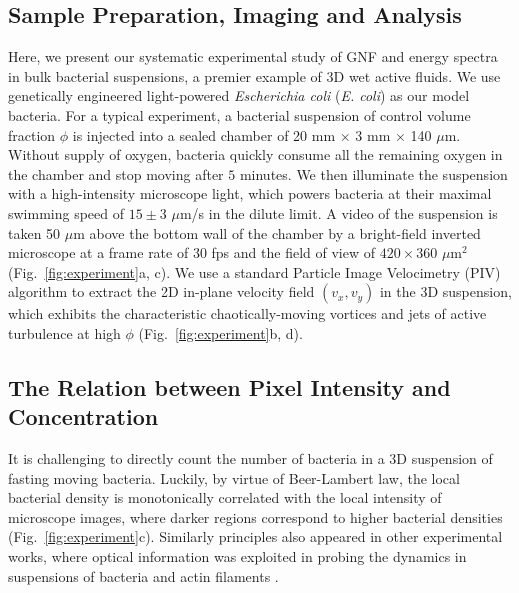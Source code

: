\subsection{Sample Preparation, Imaging and Analysis}
Here, we present our systematic experimental study of GNF and energy spectra in bulk bacterial suspensions, a premier example of 3D wet active fluids. We use genetically engineered light-powered \textit{Escherichia coli} (\textit{E. coli}) as our model bacteria.
For a typical experiment, a bacterial suspension of control volume fraction $\phi$ is injected into a sealed chamber of 20 mm $\times$ 3 mm $\times$ 140 $\mu$m.
Without supply of oxygen, bacteria quickly consume all the remaining oxygen in the chamber and stop moving after $5$ minutes.
We then illuminate the suspension with a high-intensity microscope light, which powers bacteria at their maximal swimming speed of $15 \pm 3$ $\mu$m/s in the dilute limit.
A video of the suspension is taken 50 $\mu$m above the bottom wall of the chamber by a bright-field inverted microscope at a frame rate of $30$ fps and the field of view of $420 \times 360$ $\mu$m$^2$ (Fig.~\ref{fig:experiment}a, c).
We use a standard Particle Image Velocimetry (PIV) algorithm \cite{OpenPIV-website}
to extract the 2D in-plane velocity field $(v_x,v_y)$ in the 3D suspension, which exhibits the characteristic chaotically-moving vortices and jets of active turbulence at high $\phi$ (Fig.~\ref{fig:experiment}b, d).

\subsection{The Relation between Pixel Intensity and Concentration}

It is challenging to directly count the number of bacteria in a 3D suspension of fasting moving bacteria. Luckily, by virtue of Beer-Lambert law, the local bacterial density is monotonically correlated with the local intensity of microscope images, where darker regions correspond to higher bacterial densities (Fig.~\ref{fig:experiment}c). Similarly principles also appeared in other experimental works, where optical information was exploited in probing the dynamics in suspensions of bacteria and actin filaments \cite{Sokolov2009, Wilson2011, Schaller2013}.

